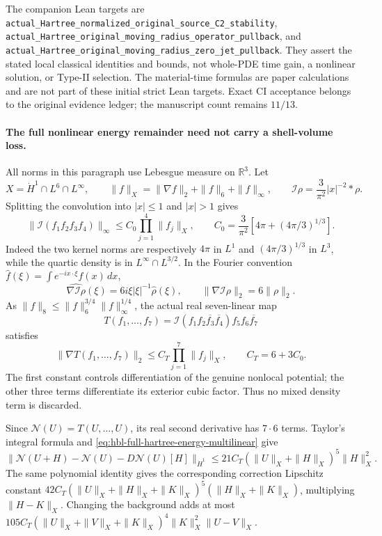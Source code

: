 \documentclass[11pt]{amsart}
\begin{document}
The companion Lean targets are
\texttt{actual\_Hartree\_normalized\_original\_source\_C2\_stability},
\texttt{actual\_Hartree\_original\_moving\_radius\_operator\_pullback},
and \texttt{actual\_Hartree\_original\_moving\_radius\_zero\_jet\_pullback}.
They assert the stated local classical identities and bounds, not
whole-PDE time gain, a nonlinear solution, or Type-II selection.
The material-time formulas are paper calculations and are not part of
these initial strict Lean targets.  Exact CI acceptance belongs to the
original evidence ledger; the manuscript count remains \(11/13\).


\paragraph{The full nonlinear energy remainder need not carry a shell-volume loss.}
All norms in this paragraph use Lebesgue measure on \(\mathbb R^3\).
Let
\[
 X=\dot H^1\cap L^6\cap L^\infty,\qquad
 \|f\|_X=\|\nabla f\|_2+\|f\|_6+\|f\|_\infty,
 \qquad \mathcal I\rho=\frac3{\pi^2}|x|^{-2}*\rho.
\]
Splitting the convolution into \(|x|\le1\) and \(|x|>1\) gives
\[
 \|\mathcal I(f_1f_2f_3f_4)\|_\infty
 \le C_0\prod_{j=1}^4\|f_j\|_X,
 \qquad C_0=\frac3{\pi^2}\left[4\pi+(4\pi/3)^{1/3}\right].
\]
Indeed the two kernel norms are respectively \(4\pi\) in \(L^1\)
and \((4\pi/3)^{1/3}\) in \(L^3\), while the quartic density is
in \(L^\infty\cap L^{3/2}\).  In the Fourier convention
\(\widehat f(\xi)=\int e^{-ix\cdot\xi}f(x)\,dx\),
\[
 \widehat{\nabla\mathcal I\rho}(\xi)
   =6i\xi|\xi|^{-1}\widehat\rho(\xi),\qquad
 \|\nabla\mathcal I\rho\|_2=6\|\rho\|_2.
\]
As \(\|f\|_8\le\|f\|_6^{3/4}\|f\|_\infty^{1/4}\),
the actual real seven-linear map
\[
 T(f_1,\ldots,f_7)=
 \mathcal I(f_1f_2\overline{f_3}\overline{f_4})
 f_5f_6\overline{f_7}
\]
satisfies
\begin{equation}
 \|\nabla T(f_1,\ldots,f_7)\|_2
 \le C_T\prod_{j=1}^7\|f_j\|_X,
 \qquad C_T=6+3C_0.
 \label{eq:hbl-full-hartree-energy-multilinear}
\end{equation}
The first constant controls differentiation of the genuine nonlocal
potential; the other three terms differentiate its exterior cubic
factor.  Thus no mixed density term is discarded.

Since \(\mathcal N(U)=T(U,\ldots,U)\), its real second derivative
has \(7\cdot6\) terms. Taylor's integral formula and
\eqref{eq:hbl-full-hartree-energy-multilinear} give
\begin{equation}
 \|\mathcal N(U+H)-\mathcal N(U)-D\mathcal N(U)[H]\|_{\dot H^1}
 \le21C_T(\|U\|_X+\|H\|_X)^5\|H\|_X^2.
 \label{eq:hbl-full-hartree-energy-quadratic}
\end{equation}
The same polynomial identity gives the corresponding correction
Lipschitz constant
\(42C_T(\|U\|_X+\|H\|_X+\|K\|_X)^5
(\|H\|_X+\|K\|_X)\), multiplying \(\|H-K\|_X\).
Changing the background adds at most
\(105C_T(\|U\|_X+\|V\|_X+\|K\|_X)^4
\|K\|_X^2\|U-V\|_X\).
\end{document}
